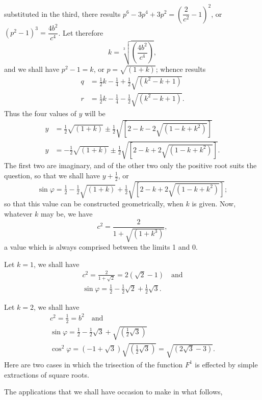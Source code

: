 \documentclass{article}
\begin{document}
substituted in the third, there results $p^{6}-3p^{4}+3p^{2}=\left(\dfrac{2}{c^{2}}-1\right)^{2}$, or $(p^{2}-1)^{3}=\dfrac{4b^{2}}{c^{4}}$. Let therefore
\[ k=\sqrt[3]{\left(\frac{4b^{2}}{c^{4}}\right)}, \]
and we shall have $p^{2}-1=k$, or $p=\sqrt{(1+k)}$; whence results
\[ \begin{aligned} q &= \tfrac{1}{2}k-\tfrac{1}{4}+\tfrac{1}{2}\sqrt{(k^{2}-k+1)} \\ r &= \tfrac{1}{2}k-\tfrac{1}{4}-\tfrac{1}{2}\sqrt{(k^{2}-k+1)}. \end{aligned} \]
Thus the four values of $y$ will be
\[ \begin{aligned} y &= \tfrac{1}{2}\sqrt{(1+k)}\pm\tfrac{1}{2}\sqrt{[2-k-2\sqrt{(1-k+k^{2})}]} \\ y &= -\tfrac{1}{2}\sqrt{(1+k)}\pm\tfrac{1}{2}\sqrt{[2-k+2\sqrt{(1-k+k^{2})}]}. \end{aligned} \]
The first two are imaginary, and of the other two only the positive root suits the question, so that we shall have $y+\frac{1}{2}$, or
\[ \sin\varphi=\tfrac{1}{2}-\tfrac{1}{2}\sqrt{(1+k)}+\tfrac{1}{2}\sqrt{[2-k+2\sqrt{(1-k+k^{2})}]}; \]
so that this value can be constructed geometrically, when $k$ is given. Now, whatever $k$ may be, we have
\[ c^{2}=\frac{2}{1+\sqrt{(1+k^{3})}}, \]
a value which is always comprised between the limits 1 and 0.

Let $k=1$, we shall have
\[ \begin{gathered} c^{2}=\frac{2}{1+\sqrt{2}}=2(\sqrt{2}-1) \quad\text{and} \\ \sin\varphi=\tfrac{1}{2}-\tfrac{1}{2}\sqrt{2}+\tfrac{1}{2}\sqrt{3}. \end{gathered} \]

Let $k=2$, we shall have
\[ \begin{gathered} c^{2}=\tfrac{1}{2}=b^{2} \quad\text{and} \\ \sin\varphi=\tfrac{1}{2}-\tfrac{1}{2}\sqrt{3}+\sqrt{(\tfrac{1}{2}\sqrt{3})} \\ \cos^{2}\varphi=(-1+\sqrt{3})\sqrt{(\tfrac{1}{2}\sqrt{3})}=\sqrt{(2\sqrt{3}-3)}. \end{gathered} \]
 Here are two cases in which the trisection of the function $F^{1}$ is effected by simple extractions of square roots.

The applications that we shall have occasion to make in what follows,
\end{document}
